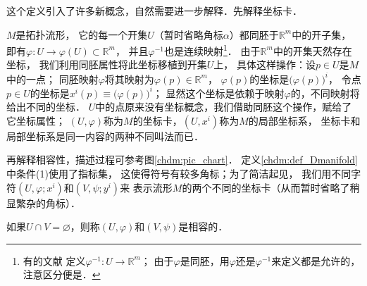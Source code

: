 这个定义引入了许多新概念，自然需要进一步解释．先解释坐标卡．

$M$是拓扑流形，%
它的每一个开集$U$（暂时省略角标$\alpha$）都同胚于$\mathbb{R}^m$中的开子集，
即有$\varphi:U \to \varphi( U) \subset \mathbb{R}^m$，
并且$\varphi^{-1}$也是连续映射{\footnote{有的文献
        定义$\varphi^{-1}:U \to \mathbb{R}^m$；
    由于$\varphi$是同胚，用$\varphi$还是$\varphi^{-1}$来定义都是允许的，注意区分便是．}}．
由于$\mathbb{R}^m$中的开集天然存在坐标，
我们利用{\kaishu 同胚}属性将此坐标移植到开集$U$上，
具体这样操作：设$p\in U$是$M$中的一点；
同胚映射$\varphi$将其映射为$\varphi(p)\in \mathbb{R}^m$，
$\varphi(p)$的坐标是$\bigl(\varphi(p)\bigr)^i$，
令点$p\in U$的坐标是$x^i(p)\equiv \bigl(\varphi(p)\bigr)^i$；
显然这个坐标是依赖于映射$\varphi$的，不同映射将给出不同的坐标．
$U$中的点原来没有坐标概念，我们借助同胚这个操作，赋给了它坐标属性；
$(U, \varphi)$称为$M$的坐标卡，$(U,x^i)$称为$M$的{\heiti 局部坐标系}，
坐标卡和局部坐标系是同一内容的两种不同叫法而已．

再解释相容性，描述过程可参考图\ref{chdm:pic_chart}．
定义\ref{chdm:def_Dmanifold}中条件(1)使用了指标集，
这使得符号有较多角标；为了简洁起见，
我们用不同字符$(U, \varphi;x^i)$和$(V, \psi;y^i)$来
表示流形$M$的两个不同的坐标卡（从而暂时省略了稍显繁杂的角标）．

如果$U \cap V = \varnothing $，则称$(U, \varphi)$和$(V, \psi)$是{\kaishu 相容的}．

